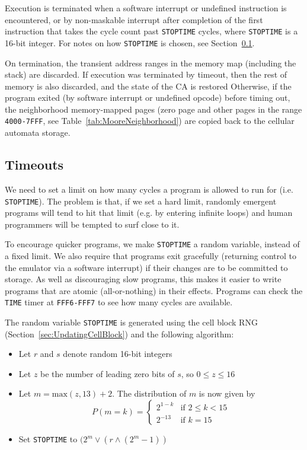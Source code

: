 \documentclass{article}
\newcommand\code[1]{{\tt #1}}
\newcommand\hex[1]{{\tt #1}}
\newcommand\hexrange[2]{\hex{#1}{\tt -}\hex{#2}}
\begin{document}
Execution is terminated
when a software interrupt or undefined instruction is encountered,
or by non-maskable interrupt after completion of the first instruction that takes the cycle count past \code{STOPTIME} cycles,
where \code{STOPTIME} is a 16-bit integer.
For notes on how \code{STOPTIME} is chosen, see Section~\ref{sec:Timeouts}.

On termination, the transient address ranges in the memory map
(including the stack) are discarded.
If execution was terminated by timeout, then the rest of memory is also discarded,
and the state of the CA is restored
Otherwise, if the program exited (by software interrupt or undefined opcode) before timing out,
the neighborhood memory-mapped pages (zero page and other pages in the range \hexrange{4000}{7FFF}, see Table~\ref{tab:MooreNeighborhood})
are copied back to the cellular automata storage.

\subsection{Timeouts}
\label{sec:Timeouts}

We need to set a limit on how many cycles a program is allowed to run for (i.e. \code{STOPTIME}).
The problem is that, if we set a hard limit, randomly emergent programs will tend to hit that limit
(e.g. by entering infinite loops)
and human programmers will be tempted to surf close to it.

To encourage quicker programs,
we make \code{STOPTIME} a random variable, instead of a fixed limit.
We also require that programs exit gracefully (returning control to the emulator via a software interrupt)
if their changes are to be committed to storage.
As well as discouraging slow programs, this makes it easier to write programs that are atomic (all-or-nothing) in their effects.
Programs can check the \code{TIME} timer at \hexrange{FFF6}{FFF7} to see how many cycles are available.

The random variable \code{STOPTIME} is generated using the cell block RNG (Section~\ref{sec:UpdatingCellBlock})
and the following algorithm:
\begin{itemize}
\item Let $r$ and $s$ denote random 16-bit integers
\item Let $z$ be the number of leading zero bits of $s$, so $0 \leq z \leq 16$
\item Let $m = \mbox{max}(z,13) + 2$. The distribution of $m$ is now given by
  \[
  P(m=k) = \left\{ \begin{array}{ll} 2^{1-k} & \mbox{if $2 \leq k < 15$} \\ 2^{-13} & \mbox{if $k = 15$} \end{array} \right.
  \]
\item Set \code{STOPTIME} to $(2^m \vee (r \wedge (2^m - 1))$
\end{itemize}
\end{document}
